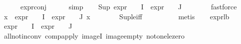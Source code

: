 \begin{isabellebody}
\ \ \ \ \isamarkupfalse%
\ expr{\isacharunderscore}{\kern0pt}{}{\isacharunderscore}{\kern0pt}conj\isanewline
\ \ \ \ \isamarkupfalse%
\ simp\isanewline
\ \ \isamarkupfalse%
\ {\isachardoublequoteopen}Sup\ {\isacharparenleft}{\kern0pt}{\isacharparenleft}{\kern0pt}expr{\isacharunderscore}{\kern0pt}{}\ {\isasymcirc}\ {\isasymPhi}{\isacharparenright}{\kern0pt}\ {\isacharbackquote}{\kern0pt}\ I\ {\isasymunion}\ {\isacharparenleft}{\kern0pt}expr{\isacharunderscore}{\kern0pt}{}\ {\isasymcirc}\ {\isasymPhi}{\isacharparenright}{\kern0pt}\ {\isacharbackquote}{\kern0pt}\ J{\isacharparenright}{\kern0pt}\ {\isasymle}\ {}{\isachardoublequoteclose}\isanewline
\ \ \ \ \isamarkupfalse%
\ fastforce\isanewline
\ \ \isamarkupfalse%
\ {\isachardoublequoteopen}{\isasymforall}x\ {\isasymin}\ {\isacharparenleft}{\kern0pt}{\isacharparenleft}{\kern0pt}expr{\isacharunderscore}{\kern0pt}{}\ {\isasymcirc}\ {\isasymPhi}{\isacharparenright}{\kern0pt}\ {\isacharbackquote}{\kern0pt}\ I\ {\isasymunion}\ {\isacharparenleft}{\kern0pt}expr{\isacharunderscore}{\kern0pt}{}\ {\isasymcirc}\ {\isasymPhi}{\isacharparenright}{\kern0pt}\ {\isacharbackquote}{\kern0pt}\ J{\isacharparenright}{\kern0pt}{\isachardot}{\kern0pt}\ x\ {\isasymle}\ {}{\isachardoublequoteclose}\isanewline
\ \ \ \ \isamarkupfalse%
\ Sup{\isacharunderscore}{\kern0pt}le{\isacharunderscore}{\kern0pt}iff\ \ \ \ \isanewline
\ \ \ \ \isamarkupfalse%
\ metis\isanewline
\ \ \isamarkupfalse%
\ expr{\isacharunderscore}{\kern0pt}{}{\isacharunderscore}{\kern0pt}lb\ \isamarkupfalse%
\ {\isachardoublequoteopen}{\isacharparenleft}{\kern0pt}expr{\isacharunderscore}{\kern0pt}{}\ {\isasymcirc}\ {\isasymPhi}{\isacharparenright}{\kern0pt}\ {\isacharbackquote}{\kern0pt}\ I\ {\isasymunion}\ {\isacharparenleft}{\kern0pt}expr{\isacharunderscore}{\kern0pt}{}\ {\isasymcirc}\ {\isasymPhi}{\isacharparenright}{\kern0pt}\ {\isacharbackquote}{\kern0pt}\ J\ {\isacharequal}{\kern0pt}\ {\isacharbraceleft}{\kern0pt}{\isacharbraceright}{\kern0pt}{\isachardoublequoteclose}\isanewline
\ \ \ \ \isamarkupfalse%
\ all{\isacharunderscore}{\kern0pt}not{\isacharunderscore}{\kern0pt}in{\isacharunderscore}{\kern0pt}conv\ comp{\isacharunderscore}{\kern0pt}apply\ imageI\ image{\isacharunderscore}{\kern0pt}empty\ not{\isacharunderscore}{\kern0pt}one{\isacharunderscore}{\kern0pt}le{\isacharunderscore}{\kern0pt}zero\isanewline

\end{isabellebody}
